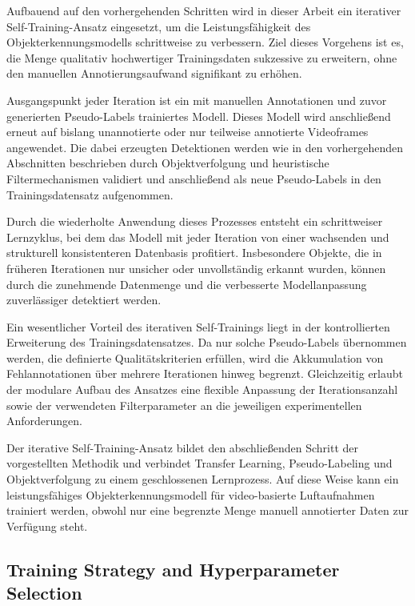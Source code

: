 Aufbauend auf den vorhergehenden Schritten wird in dieser Arbeit ein iterativer 
Self-Training-Ansatz eingesetzt, um die Leistungsfähigkeit des 
Objekterkennungsmodells schrittweise zu verbessern. Ziel dieses Vorgehens ist es, 
die Menge qualitativ hochwertiger Trainingsdaten sukzessive zu erweitern, ohne 
den manuellen Annotierungsaufwand signifikant zu erhöhen.

Ausgangspunkt jeder Iteration ist ein mit manuellen Annotationen und zuvor 
generierten Pseudo-Labels trainiertes Modell. Dieses Modell wird anschließend 
erneut auf bislang unannotierte oder nur teilweise annotierte Videoframes 
angewendet. Die dabei erzeugten Detektionen werden wie in den vorhergehenden 
Abschnitten beschrieben durch Objektverfolgung und heuristische Filtermechanismen 
validiert und anschließend als neue Pseudo-Labels in den Trainingsdatensatz 
aufgenommen.

Durch die wiederholte Anwendung dieses Prozesses entsteht ein schrittweiser 
Lernzyklus, bei dem das Modell mit jeder Iteration von einer wachsenden und 
strukturell konsistenteren Datenbasis profitiert. Insbesondere Objekte, die in 
früheren Iterationen nur unsicher oder unvollständig erkannt wurden, können durch 
die zunehmende Datenmenge und die verbesserte Modellanpassung zuverlässiger 
detektiert werden.

Ein wesentlicher Vorteil des iterativen Self-Trainings liegt in der kontrollierten 
Erweiterung des Trainingsdatensatzes. Da nur solche Pseudo-Labels übernommen 
werden, die definierte Qualitätskriterien erfüllen, wird die Akkumulation von 
Fehlannotationen über mehrere Iterationen hinweg begrenzt. Gleichzeitig erlaubt 
der modulare Aufbau des Ansatzes eine flexible Anpassung der Iterationsanzahl sowie 
der verwendeten Filterparameter an die jeweiligen experimentellen Anforderungen.

Der iterative Self-Training-Ansatz bildet den abschließenden Schritt der 
vorgestellten Methodik und verbindet Transfer Learning, Pseudo-Labeling und 
Objektverfolgung zu einem geschlossenen Lernprozess. Auf diese Weise kann ein 
leistungsfähiges Objekterkennungsmodell für video-basierte Luftaufnahmen trainiert 
werden, obwohl nur eine begrenzte Menge manuell annotierter Daten zur Verfügung 
steht.

\subsection{Training Strategy and Hyperparameter Selection}

